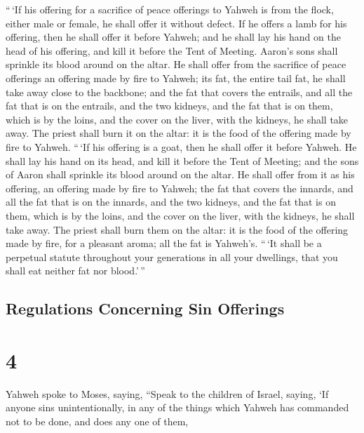  ``\,`If his offering for a sacrifice of peace offerings
to Yahweh is from the flock, either male or female, he shall offer it
without defect.  If he offers a lamb for his offering,
then he shall offer it before Yahweh;  and he shall lay
his hand on the head of his offering, and kill it before the Tent of
Meeting. Aaron's sons shall sprinkle its blood around on the altar.
 He shall offer from the sacrifice of peace offerings an
offering made by fire to Yahweh; its fat, the entire tail fat, he shall
take away close to the backbone; and the fat that covers the entrails,
and all the fat that is on the entrails,  and the two
kidneys, and the fat that is on them, which is by the loins, and the
cover on the liver, with the kidneys, he shall take away.
 The priest shall burn it on the altar: it is the food of
the offering made by fire to Yahweh.  ``\,`If his
offering is a goat, then he shall offer it before Yahweh.
 He shall lay his hand on its head, and kill it before
the Tent of Meeting; and the sons of Aaron shall sprinkle its blood
around on the altar.  He shall offer from it as his
offering, an offering made by fire to Yahweh; the fat that covers the
innards, and all the fat that is on the innards,  and the
two kidneys, and the fat that is on them, which is by the loins, and the
cover on the liver, with the kidneys, he shall take away.
 The priest shall burn them on the altar: it is the food
of the offering made by fire, for a pleasant aroma; all the fat is
Yahweh's.  ``\,`It shall be a perpetual statute
throughout your generations in all your dwellings, that you shall eat
neither fat nor blood.'\,''

\hypertarget{regulations-concerning-sin-offerings}{%
\subsection{Regulations Concerning Sin
Offerings}\label{regulations-concerning-sin-offerings}}

\hypertarget{section-3}{%
\section{4}\label{section-3}}

 Yahweh spoke to Moses, saying,  ``Speak to
the children of Israel, saying, `If anyone sins unintentionally, in any
of the things which Yahweh has commanded not to be done, and does any
one of them,

